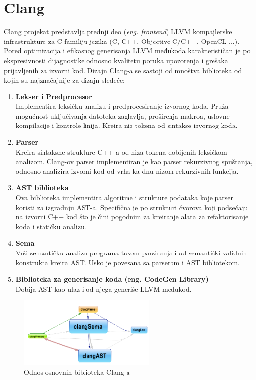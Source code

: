 \documentclass[12pt,oneside]{memoir}
\begin{document}
\section{Clang}

Clang projekat predstavlja prednji deo (\textit{eng. frontend}) LLVM kompajlerske infrastrukture za C familiju jezika (C, C++, Objective C/C++, OpenCL ...).
Pored optimizacija i efikasnog generisanja LLVM međukoda karakterističan je po ekspresivnosti dijagnostike odnosno kvalitetu poruka upozorenja i grešaka prijavljenih za izvorni kod. Dizajn Clang-a se sastoji od mnoštva biblioteka od kojih su najznačajnije za dizajn sledeće:

\begin{enumerate}
  \item{\textbf{Lekser i Predprocesor} \\
       Implementira leksičku analizu i predprocesiranje izvornog koda.
       Pruža mogućnost uključivanja datoteka zaglavlja, proširenja makroa, uslovne kompilacije i kontrole linija. 
       Kreira niz tokena od sintakse izvornog koda.}
  \item{\textbf{Parser} \\
        Kreira sintaksne strukture C++-a od niza tokena dobijenih leksičkom analizom.
        Clang-ov parser implementiran je kao parser rekurzivnog spuštanja, odnosno analizira izvorni kod od vrha ka dnu nizom rekurzivnih funkcija.}
  \item{\textbf{AST biblioteka} \\
        Ova biblioteka implementira algoritme i strukture podataka koje parser koristi za izgradnju AST-a. Specifična je po strukturi čvorova koji podsećaju na izvorni C++ kod što je čini pogodnim za kreiranje alata za refaktorisanje koda i statičku analizu.}
  \item{\textbf{Sema} \\
        Vrši semantičku analizu programa tokom parsiranja i od semantički validnih konstrukta kreira AST. Usko je povezana sa parserom i AST bibliotekom.}
  \item{\textbf{Biblioteka za generisanje koda (eng. CodeGen Library)} \\
        Dobija AST kao ulaz i od njega generiše LLVM međukod.}

\end{enumerate}

\begin{figure}[!ht]
  \centering
  \includegraphics[width=0.6\textwidth]{ClangBiblioteke.png}
  \caption{Odnos osnovnih biblioteka Clang-a}
  \label{fig:grafikon}
\end{figure}
\end{document}
